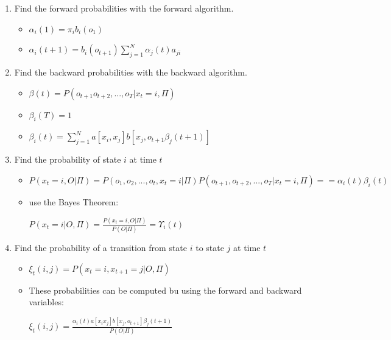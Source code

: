 \begin{enumerate}


\item Find the forward probabilities with the forward algorithm.


\begin{itemize}
\item $\alpha_{i}(1) = \pi_{i} b_{i} (o_{1})$
\item $\alpha_{i}(t + 1) = b_{i}(o_{t+1}) \sum\limits^{N}_{j=1}\alpha_{j}(t)a_{ji}$

\end{itemize}

\item Find the backward probabilities with the backward algorithm.

\begin{itemize}
\item $\beta(t) = P(o_{t+1} o_{t+2},...,o_{T} | x_{t} = i, \Pi) $

\item $\beta_{i}(T) = 1$
\item $\beta_{i}(t) = \sum\limits^{N}_{j=1} a[x_i, x_j] b[x_j,o_{t + 1}\beta_{j}(t + 1)]$

\end{itemize}
\item Find the probability of state $i$ at time $t$

\begin{itemize}

\item $P (x_t = i, O | \Pi) = P (o_1, o_2,...,o_t, x_t = i | \Pi) P (o_{t + 1}, o_{t + 2},...,o_{T} | x_{t} = i, \Pi) == \alpha_{i}(t) \beta_{i}(t) $

\item use the Bayes Theorem:

$P(x_t = i | O, \Pi) = \frac{P(x_t = i, O | \Pi)}{P(O | \Pi)} = \Upsilon_{i}(t)$

\end{itemize}
\item Find the probability of a transition from state $i$ to state $j$ at time $t$

\begin{itemize}
\item $\xi_{t}(i,j) = P (x_t = i,x_{t + 1} = j | O, \Pi)$


\item These probabilities can be computed bu using the forward and backward variables:

$\xi_{t}(i,j) = \frac{\alpha_i (t) a[x_i x_j] b[x_j,o_{t + 1}] \beta_j (t + 1)   }{P(O | \Pi)}$


\end{itemize}
\end{enumerate}
